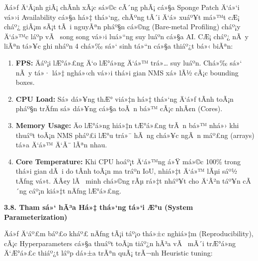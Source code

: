 \documentclass[]{article}
\begin{document}
Äá»ƒ Ä‘Ã¡nh giÃ¡ chÃ­nh xÃ¡c sá»©c cÃ´ng phÃ¡ cá»§a Sponge Patch Ä‘á»‘i vá»›i Availability 
cá»§a há»‡ thá»‘ng, chÃºng tÃ´i Ä‘á» xuáº¥t má»™t cÆ¡ cháº¿ giÃ¡m sÃ¡t tÃ i nguyÃªn pháº§n
cá»©ng (Bare-metal Profiling) cháº¡y Ä‘á»™c láº­p vÃ  song song vá»›i luá»“ng suy luáº­n
cá»§a AI. CÆ¡ cháº¿ nÃ y liÃªn tá»¥c ghi nháº­n 4 chá»‰ sá»‘ sinh tá»“n cá»§a thiáº¿t bá»‹
biÃªn:

\begin{enumerate}
\def\labelenumi{\arabic{enumi}.}
\item
  \textbf{FPS:} Äáº¡i lÆ°á»£ng Ä‘o lÆ°á»ng Ä‘á»™ trá»… suy
  luáº­n. Chá»‰ sá»‘ nÃ y tá»· lá»‡ nghá»‹ch vá»›i thá»i gian NMS xá»­ lÃ½ cÃ¡c bounding boxes.
\item
  \textbf{CPU Load:} Sá»­ dá»¥ng thÆ° viá»‡n há»‡ thá»‘ng Ä‘á»ƒ tÃ­nh
  toÃ¡n pháº§n trÄƒm sá»­ dá»¥ng cá»§a toÃ n bá»™ cÃ¡c nhÃ¢n (Cores).
\item
  \textbf{Memory Usage:} Äo lÆ°á»ng hiá»‡n tÆ°á»£ng trÃ n bá»™
  nhá»› khi thuáº­t toÃ¡n NMS pháº£i lÆ°u trá»¯ hÃ ng chá»¥c ngÃ n máº£ng (arrays) tá»a
  Ä‘á»™ Ä‘Ã¨ lÃªn nhau.
\item
  \textbf{Core Temperature:} Khi CPU hoáº¡t Ä‘á»™ng á»Ÿ má»©c
  100\% trong thá»i gian dÃ i do tÃ­nh toÃ¡n ma tráº­n IoU, nhiá»‡t Ä‘á»™ lÃµi sáº½
  tÄƒng vá»t. ÄÃ¢y lÃ  minh chá»©ng rÃµ rá»‡t nháº¥t cho Ä‘Ã²n táº¥n cÃ´ng cáº¡n kiá»‡t nÄƒng
  lÆ°á»£ng.
\end{enumerate}

\textbf{3.8. Tham sá»‘ hÃ³a Há»‡ thá»‘ng tá»‘i Æ°u (System Parameterization)}

Äá»ƒ Ä‘áº£m báº£o kháº£ nÄƒng tÃ¡i táº¡o thá»±c nghiá»‡m (Reproducibility), cÃ¡c Hyperparameters 
cá»§a thuáº­t toÃ¡n tiáº¿n hÃ³a vÃ  mÃ´i trÆ°á»ng Ä‘Æ°á»£c thiáº¿t láº­p dá»±a trÃªn quÃ¡ trÃ¬nh 
Heuristic tuning:
\end{document}
